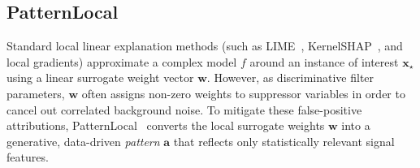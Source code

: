\documentclass[pdflatex,sn-mathphys-num]{sn-jnl}
\theoremstyle{thmstyleone}
\theoremstyle{thmstyletwo}%
\theoremstyle{thmstylethree}%
\begin{document}
\subsection{PatternLocal}\label{sec:patternlocal}
Standard local linear explanation methods (such as LIME~\cite{ribeiro2016}, KernelSHAP~\cite{lundberg2017unified}, and local gradients) approximate a complex model $f$ around an instance of interest $\mathbf{x}_\star$ using a linear surrogate weight vector $\mathbf{w}$. However, as discriminative filter parameters, $\mathbf{w}$ often assigns non-zero weights to suppressor variables in order to cancel out correlated background noise. To mitigate these false-positive attributions, PatternLocal~\cite{gjoelbye2025} converts the local surrogate weights $\mathbf{w}$ into a generative, data-driven \emph{pattern} $\mathbf{a}$ that reflects only statistically relevant signal features.
\end{document}
